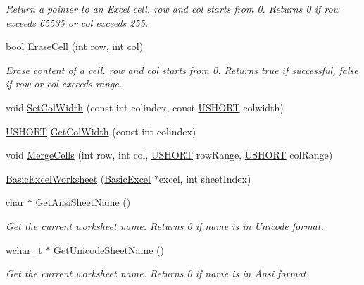 \begin{DoxyCompactItemize}
\begin{DoxyCompactList}\small\item\em Return a pointer to an Excel cell. row and col starts from 0. Returns 0 if row exceeds 65535 or col exceeds 255. \end{DoxyCompactList}\item 
bool \hyperlink{class_y_excel_1_1_basic_excel_worksheet_a60a1ac663ba3bc3aa9668db035fa750c}{Erase\+Cell} (int row, int col)
\begin{DoxyCompactList}\small\item\em Erase content of a cell. row and col starts from 0. Returns true if successful, false if row or col exceeds range. \end{DoxyCompactList}\item 
void \hyperlink{class_y_excel_1_1_basic_excel_worksheet_aa6622d706fc57b443aa658ea06aee080}{Set\+Col\+Width} (const int colindex, const \hyperlink{_basic_excel_8hpp_a5850d5316caf7f4cedd742fdf8cd7c02}{U\+S\+H\+O\+R\+T} colwidth)
\item 
\hyperlink{_basic_excel_8hpp_a5850d5316caf7f4cedd742fdf8cd7c02}{U\+S\+H\+O\+R\+T} \hyperlink{class_y_excel_1_1_basic_excel_worksheet_a301a34eb141164d9d96046308b29e273}{Get\+Col\+Width} (const int colindex)
\item 
void \hyperlink{class_y_excel_1_1_basic_excel_worksheet_a88827fd80b0b55be52824d3e191b51cc}{Merge\+Cells} (int row, int col, \hyperlink{_basic_excel_8hpp_a5850d5316caf7f4cedd742fdf8cd7c02}{U\+S\+H\+O\+R\+T} row\+Range, \hyperlink{_basic_excel_8hpp_a5850d5316caf7f4cedd742fdf8cd7c02}{U\+S\+H\+O\+R\+T} col\+Range)
\item 
\hyperlink{class_y_excel_1_1_basic_excel_worksheet_a5b2b6fc3712e8e8742336ea058dc5a9c}{Basic\+Excel\+Worksheet} (\hyperlink{class_y_excel_1_1_basic_excel}{Basic\+Excel} $\ast$excel, int sheet\+Index)
\item 
char $\ast$ \hyperlink{class_y_excel_1_1_basic_excel_worksheet_a83a14ff0996bd3fd0e899b2b9df514c6}{Get\+Ansi\+Sheet\+Name} ()
\begin{DoxyCompactList}\small\item\em Get the current worksheet name. Returns 0 if name is in Unicode format. \end{DoxyCompactList}\item 
wchar\+\_\+t $\ast$ \hyperlink{class_y_excel_1_1_basic_excel_worksheet_af11230fe3e5f0e49b633c7b452d1c312}{Get\+Unicode\+Sheet\+Name} ()
\begin{DoxyCompactList}\small\item\em Get the current worksheet name. Returns 0 if name is in Ansi format. \end{DoxyCompactList}\item 

\end{DoxyCompactItemize}
